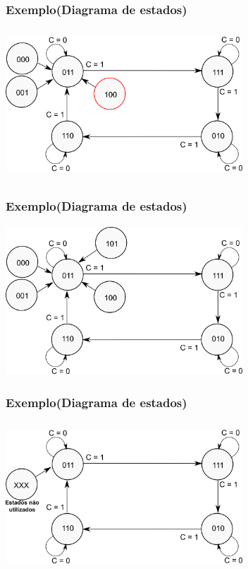 \documentclass{beamer}
\begin{document}
\begin{frame}
  \frametitle{Exemplo(Diagrama de estados)}
  \begin{center}
    \includegraphics[height = 2.2in, width = 3.5in]
      {images/exemplo_projeto_8.png}
  \end{center}
\end{frame}

\begin{frame}
  \frametitle{Exemplo(Diagrama de estados)}
  \begin{center}
    \includegraphics[height = 2.2in, width = 3.5in]
      {images/exemplo_projeto_9.png}
  \end{center}
\end{frame}

\begin{frame}
  \frametitle{Exemplo(Diagrama de estados)}
  \begin{center}
    \includegraphics[height = 2.2in, width = 3.5in]
      {images/exemplo_projeto_10.png}
  \end{center}
\end{frame}
\end{document}
